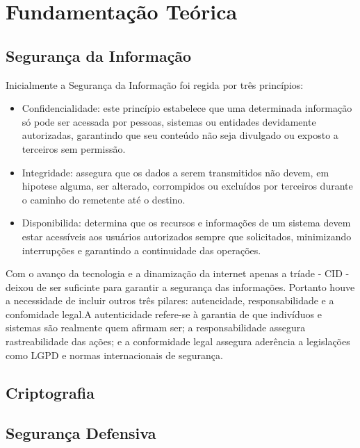 \chapter{Fundamentação Teórica}
\label{sec:fundamentacao}

\section{Segurança da Informação}
    Inicialmente a Segurança da Informação foi regida por três princípios:
    \begin{itemize}
        \item Confidencialidade: este princípio estabelece que uma determinada informação só pode 
        ser acessada por pessoas, sistemas ou entidades devidamente autorizadas, garantindo que seu
        conteúdo não seja divulgado ou exposto a terceiros sem permissão\citep{fontes2017segurancca}. 
        \item Integridade: assegura que os dados a serem transmitidos não devem, em hipotese alguma, ser alterado,
        corrompidos ou excluídos por terceiros durante o caminho do remetente até o destino\citep{fernandes2018segurancca}.    
        \item Disponibilida: determina que os recursos e informações de um sistema devem estar acessíveis aos usuários
        autorizados sempre que solicitados, minimizando interrupções e garantindo a continuidade das operações\citep{moreno2019introduccao}.
    \end{itemize}

    Com o avanço da tecnologia e a dinamização da internet apenas a tríade - CID - deixou de ser 
    suficinte para garantir a segurança das informações. Portanto houve a necessidade de incluir outros 
    três pilares: autencidade, responsabilidade e a confomidade legal.A autenticidade refere-se à garantia
    de que indivíduos e sistemas são realmente quem afirmam ser; a responsabilidade assegura rastreabilidade
    das ações; e a conformidade legal assegura aderência a legislações como LGPD e normas internacionais
    de segurança. \citep{iso27001_2013}

\section{Criptografia}

\section{Segurança Defensiva}

